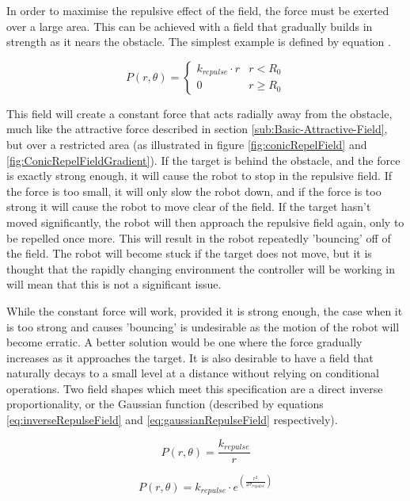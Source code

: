 \documentclass[10pt,british,english]{article}
\begin{document}
In order to maximise the repulsive effect of the field, the force must be exerted over a large area. This can be achieved with a field that gradually builds in strength as it nears the obstacle. The simplest example is defined by equation .

\[
P\left(r,\theta\right)=\begin{cases}
k_{repulse}\cdot r & r<R_{0}\\
0 & r\geq R_{0}
\end{cases}
\]

This field will create a constant force that acts radially away from the obstacle, much like the attractive force described in section \ref{sub:Basic-Attractive-Field}, but over a restricted area (as illustrated in figure \ref{fig:conicRepelField} and \ref{fig:ConicRepelFieldGradient}). If the target is behind the obstacle, and the force is exactly strong enough, it will cause the robot to stop in the repulsive field. If the force is too small, it will only slow the robot down, and if the force is too strong it will cause the robot to move clear of the field. If the target hasn't moved significantly, the robot will then approach the repulsive field again, only to be repelled once more. This will result in the robot repeatedly 'bouncing' off of the field. The robot will become stuck if the target does not move, but it is thought that the rapidly changing environment the controller will be working in will mean that this is not a significant issue.

While the constant force will work, provided it is strong enough, the case when it is too strong and causes 'bouncing' is undesirable as the motion of the robot will become erratic. A better solution would be one where the force gradually increases as it approaches the target. It is also desirable to have a field that naturally decays to a small level at a distance without relying on conditional operations. Two field shapes which meet this specification are a direct inverse proportionality, or the Gaussian function (described by equations \ref{eq:inverseRepulseField} and \ref{eq:gaussianRepulseField} respectively).

\begin{equation}
P\left(r,\theta\right)=\frac{k_{repulse}}{r}\label{eq:inverseRepulseField}
\end{equation}

\begin{equation}
P\left(r,\theta\right)=k_{repulse}\cdot e^{\left(\frac{r^{2}}{2\sigma_{repulse}}\right)}\label{eq:gaussianRepulseField}
\end{equation}
\end{document}
